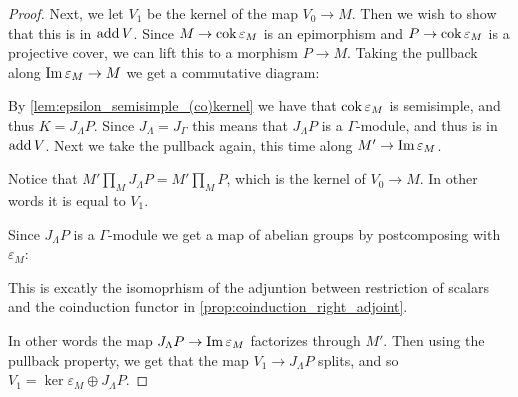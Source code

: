 \begin{theorem}
\begin{proof}
		Next, we let $V_1$ be the kernel of the map $V_0 \to M$. Then we wish to show that this is in $\operatorname{add} V$. Since $M \to \operatorname{cok}\varepsilon_M$ is an epimorphism and $P \to \operatorname{cok}\varepsilon_M$ is a projective cover, we can lift this to a morphism $P \to M$. Taking the pullback along $\operatorname{Im} \varepsilon_M \to M$ we get a commutative diagram:
		\begin{center}
		\end{center} 
		By \cref{lem:epsilon_semisimple_(co)kernel} we have that $ \operatorname{cok}\varepsilon_M $ is semisimple, and thus $K = J_\Lambda P$. Since $J_\Lambda=J_\Gamma$ this means that $J_\Lambda P$ is a $\Gamma$-module, and thus is in $\operatorname{add} V$. Next we take the pullback again, this time along $M' \to \operatorname{Im} \varepsilon_M$. 
		\begin{center}
		\end{center} 
		Notice that $M'\prod\limits_M J_\Lambda P = M'\prod\limits_M P$, which is the kernel of $V_0 \to M$. In other words it is equal to $V_1$.
		
		Since $J_\Lambda P$ is a $\Gamma$-module we get a map of abelian groups by postcomposing with $\varepsilon_M$:
		\begin{center}
		\end{center} 
		This is excatly the isomoprhism of the adjuntion between restriction of scalars and the coinduction functor in \cref{prop:coinduction_right_adjoint}.

		In other words the map $J_\Lambda P \to \operatorname{Im} \varepsilon_M$ factorizes through $M'$. Then using the pullback property, we get that the map $V_1 \to J_\Lambda P$ splits, and so $V_1 = \ker\varepsilon_M \oplus J_\Lambda P$. 
		

\end{proof}
\end{theorem}
